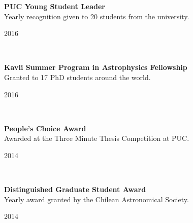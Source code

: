 \documentclass[12pt, a4paper]{article} %
\begin{document}
\begin{minipage}[t]{0.7\textwidth}
\begin{flushleft}%
  \setlength{\leftskip}{0.2cm}%
\textbf{PUC Young Student Leader}\\
Yearly recognition given to 20 students from the university.
\end{flushleft}
\end{minipage}
\begin{minipage}[t]{0.3\textwidth}
\hfill 2016
\end{minipage}\\

\begin{minipage}[t]{0.7\textwidth}
\begin{flushleft}%
  \setlength{\leftskip}{0.2cm}%
\textbf{Kavli Summer Program in Astrophysics Fellowship}\\
Granted to 17 PhD students around the world.
\end{flushleft}
\end{minipage}
\begin{minipage}[t]{0.3\textwidth}
\hfill 2016
\end{minipage}\\

\begin{minipage}[t]{0.7\textwidth}
\begin{flushleft}%
  \setlength{\leftskip}{0.2cm}%
\textbf{People's Choice Award}\\
 Awarded at the Three Minute Thesis\textsuperscript{\textregistered} Competition at PUC.
 \end{flushleft}
\end{minipage}
\begin{minipage}[t]{0.3\textwidth}
\hfill 2014
\end{minipage}\\

\begin{minipage}[t]{0.7\textwidth}
\begin{flushleft}%
  \setlength{\leftskip}{0.2cm}%
\textbf{Distinguished Graduate Student Award}\\
 Yearly award granted by the Chilean Astronomical Society.
 \end{flushleft}
\end{minipage}
\begin{minipage}[t]{0.3\textwidth}
\hfill 2014
\end{minipage}\\
\end{document}
